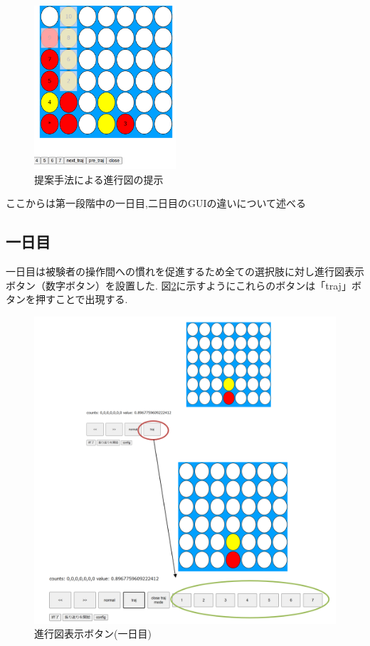\begin{figure}[t]
	\centering
	\includegraphics[width=150pt]{./figure/multi.png}
	\caption{提案手法による進行図の提示}
	\label{fig:multi}
\end{figure}
ここからは第一段階中の一日目,二日目のGUIの違いについて述べる
\subsection{一日目}
一日目は被験者の操作間への慣れを促進するため全ての選択肢に対し進行図表示ボタン（数字ボタン）を設置した.
図\ref{fig:traj-button}に示すようにこれらのボタンは「traj」ボタンを押すことで出現する.
\begin{figure}[t]
	\centering
	\includegraphics[width=\linewidth]{./figure/traj-button.png}
	\caption{進行図表示ボタン(一日目)}
	\label{fig:traj-button}
\end{figure}
